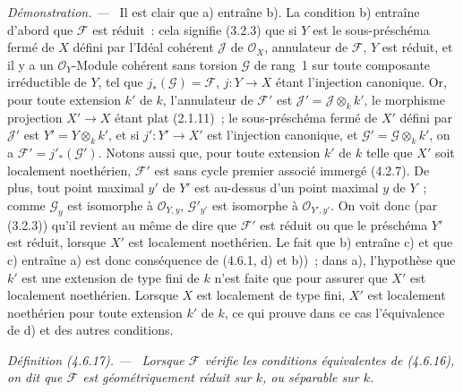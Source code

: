 \documentclass[10pt,oneside]{book}
\newenvironment{definition}[1][]{%
  \par\medskip\noindent\itshape Définition (#1). ---\ }{\par}
\newenvironment{proof}{%
  \par\medskip\noindent\textit{Démonstration. ---\ }}{\par}
\begin{document}
\begin{proof}
Il est clair que a) entraîne b). La condition b) entraîne d'abord que
$\mathscr F$ est réduit~: cela signifie (3.2.3) que si $Y$ est le
sous-préschéma fermé de $X$ défini par l'Idéal cohérent $\mathscr J$ de
$\mathcal O_X$, annulateur de $\mathscr F$, $Y$ est réduit, et il y a un
$\mathcal O_Y$-Module cohérent sans torsion $\mathscr G$ de rang~1 sur toute
composante irréductible de $Y$, tel que $j_*(\mathscr G)=\mathscr F$,
$j:Y\to X$ étant l'injection canonique. Or, pour toute extension $k'$ de $k$,
l'annulateur de $\mathscr F'$ est $\mathscr J'=\mathscr J\otimes_k k'$, le
morphisme projection $X'\to X$ étant plat (2.1.11)~; le sous-préschéma fermé de
$X'$ défini par $\mathscr J'$ est $Y'=Y\otimes_k k'$, et si
$j':Y'\to X'$ est l'injection canonique, et
$\mathscr G'=\mathscr G\otimes_k k'$, on a $\mathscr F'=j'_*(\mathscr G')$.
Notons aussi que, pour toute extension $k'$ de $k$ telle que $X'$ soit
localement noethérien, $\mathscr F'$ est sans cycle premier associé immergé
(4.2.7). De plus, tout point maximal $y'$ de $Y'$ est au-dessus d'un point
maximal $y$ de $Y$~; comme $\mathscr G_y$ est isomorphe à
$\mathcal O_{Y,y}$, $\mathscr G'_{y'}$ est isomorphe à
$\mathcal O_{Y',y'}$. On voit donc (par (3.2.3)) qu'il revient au même de dire
que $\mathscr F'$ est réduit ou que le préschéma $Y'$ est réduit, lorsque $X'$
est localement noethérien. Le fait que b) entraîne c) et que c) entraîne
a) est donc conséquence de (4.6.1, d) et b))~; dans a), l'hypothèse que
$k'$ est une extension de type fini de $k$ n'est faite que pour assurer que
$X'$ est localement noethérien. Lorsque $X$ est localement de type fini, $X'$
est localement noethérien pour toute extension $k'$ de $k$, ce qui prouve dans
ce cas l'équivalence de d) et des autres conditions.
\end{proof}

\begin{definition}[4.6.17]
\label{IV.2.4.6.17-fr}
Lorsque $\mathscr F$ vérifie les conditions équivalentes de (4.6.16), on dit
que $\mathscr F$ est \emph{géométriquement réduit} sur $k$, ou \emph{séparable}
sur $k$.
\end{definition}
\end{document}
